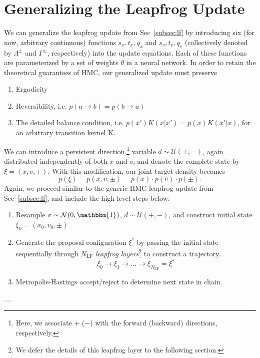 \documentclass[a4paper,11pt]{article}
\begin{document}
\section{\label{sec:l2hmc}Generalizing the Leapfrog Update}
%
We can generalize the leapfrog update from Sec~\ref{subsec:lf} by introducing
six (for now, arbitrary continuous) functions \(s_{x}, t_{x}, q_{x}\) and
\(s_{v}, t_{v}, q_{v}\) (collectively denoted by \(\Lambda^{\pm}\) and
\(\Gamma^{\pm}\), respectively) into the update equations.
%
Each of these functions are parameterized by a set of weights \(\theta\) in a
neural network.
%
In order to retain the theoretical guarantees of HMC, our generalized update
must preserve
%
\begin{enumerate}
    \item Ergodicity
    \item Reversibility, i.e. \(p(a \rightarrow b) = p(b \rightarrow a)\)
    \item The detailed balance condition, i.e. \(p(x') K(x|x') = p(x)
        K(x'|x)\), for an arbitrary transition kernel K.
\end{enumerate}
%
We can introduce a persistent direction,\footnote{%
    Here, we associate \(+\) (\(-\)) with the forward (backward) directions,
    respectively.
}
variable \(d \sim \mathcal{U}(+, -)\), again distributed independently of both
\(x\) and \(v\), and denote the complete state by \(\xi = (x, v, \pm)\).
%
With this modification, our joint target density becomes
%
\begin{equation}
    p(\xi) = p(x, v, \pm) = p(x)\cdot p(v)\cdot p(\pm).
\end{equation}
%
Again, we proceed similar to the generic HMC leapfrog update from
Sec~\ref{subsec:lf}, and include the high-level steps below:
%
\begin{enumerate}
    \item Resample \(v \sim \mathcal{N} (0, \mathbbm{1})\), \(d \sim
        \mathcal{U} (+, -)\), and construct initial state \(\xi_{0} = (x_{0},
        v_{0}, \pm)\)
    \item Generate the proposal configuration \(\xi^{\ast}\) by passing the
        initial state sequentially through \(N_{\mathrm{LF}}\) \emph{leapfrog
            layers}\footnote{%
            We defer the details of this leapfrog layer to the following
            section.
        } to construct a trajectory.
	    \begin{equation}
            \xi_{0} \rightarrow \xi_{1} \rightarrow \ldots \rightarrow%
            \xi_{N_{\mathrm{LF}}} = \xi^{\ast}
        \end{equation}
    \item Metropolis-Hastings accept/reject to determine next state in chain.
\end{enumerate}




%
%
\begin{thebibliography}{99}
....

\end{thebibliography}
\end{document}
